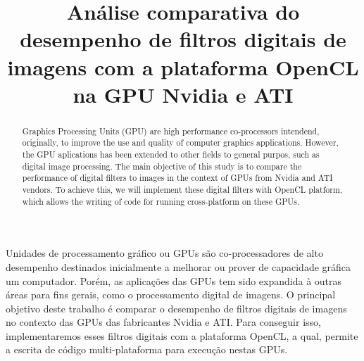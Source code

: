 

\title{Análise comparativa do desempenho de filtros digitais de imagens com a plataforma OpenCL na GPU Nvidia e ATI}



\maketitle

\begin{abstract}
Graphics Processing Units (GPU) are high performance co-processors intendend, originally, to improve the use and quality of computer graphics applications. However, the GPU aplications has been extended to other fields to general purpos, such as digital image processing. The main objective of this study is to compare the performance of digital filters to images in the context of GPUs from Nvidia and ATI vendors. To achieve this, we will implement these digital filters with OpenCL platform, which allows the writing of code for running cross-platform on these GPUs.
\end{abstract}

\begin{resumo}
Unidades de processamento gráfico ou GPUs são co-processadores de alto desempenho destinados inicialmente a melhorar ou prover de capacidade gráfica um computador. Porém, as aplicações das GPUs tem sido expandida à outras áreas para fins gerais, como o processamento digital de imagens. O principal objetivo deste trabalho é comparar o desempenho de filtros digitais de imagens no contexto das  GPUs das fabricantes Nvidia e ATI. Para conseguir isso, implementaremos esses filtros digitais com a plataforma OpenCL, a qual,  permite a escrita de código multi-plataforma para execução nestas GPUs.
\end{resumo}

